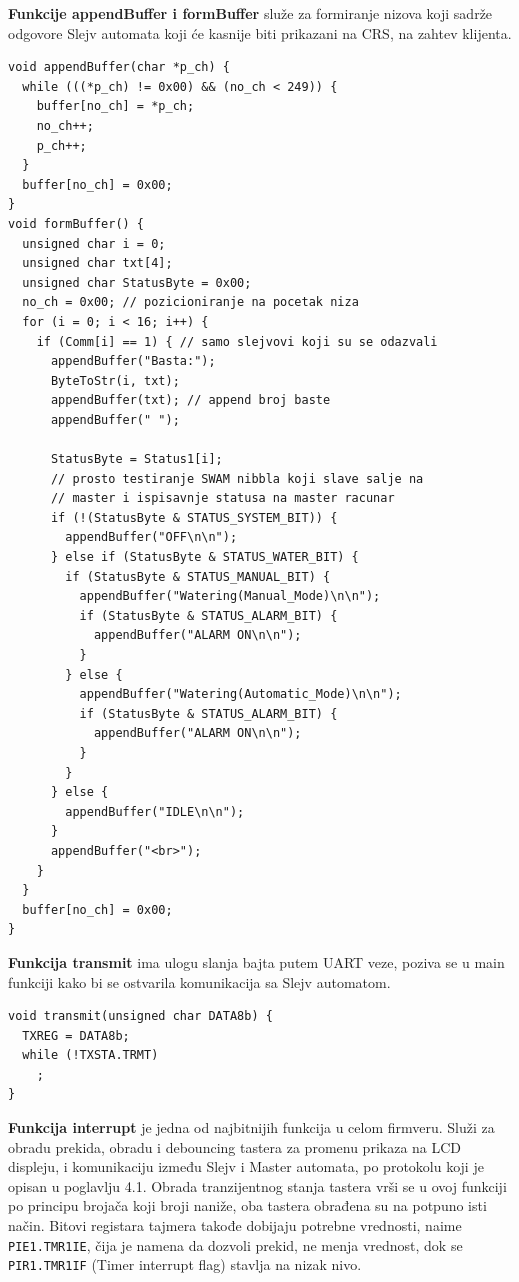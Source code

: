 \documentclass[12pt]{article}
\numberwithin{figure}{section}
\begin{document}
\textbf{Funkcije appendBuffer i formBuffer} služe za formiranje nizova koji sadrže odgovore Slejv automata koji će kasnije biti prikazani na CRS, na zahtev klijenta.
\begin{verbatim}
void appendBuffer(char *p_ch) {
  while (((*p_ch) != 0x00) && (no_ch < 249)) {
    buffer[no_ch] = *p_ch;
    no_ch++;
    p_ch++;
  }
  buffer[no_ch] = 0x00;
}
void formBuffer() {
  unsigned char i = 0;
  unsigned char txt[4];
  unsigned char StatusByte = 0x00;
  no_ch = 0x00; // pozicioniranje na pocetak niza
  for (i = 0; i < 16; i++) {
    if (Comm[i] == 1) { // samo slejvovi koji su se odazvali
      appendBuffer("Basta:");
      ByteToStr(i, txt);
      appendBuffer(txt); // append broj baste
      appendBuffer(" ");

      StatusByte = Status1[i];
      // prosto testiranje SWAM nibbla koji slave salje na
      // master i ispisavnje statusa na master racunar
      if (!(StatusByte & STATUS_SYSTEM_BIT)) {
        appendBuffer("OFF\n\n");
      } else if (StatusByte & STATUS_WATER_BIT) {
        if (StatusByte & STATUS_MANUAL_BIT) {
          appendBuffer("Watering(Manual_Mode)\n\n");
          if (StatusByte & STATUS_ALARM_BIT) {
            appendBuffer("ALARM ON\n\n");
          }
        } else {
          appendBuffer("Watering(Automatic_Mode)\n\n");
          if (StatusByte & STATUS_ALARM_BIT) {
            appendBuffer("ALARM ON\n\n");
          }
        }
      } else {
        appendBuffer("IDLE\n\n");
      }
      appendBuffer("<br>");
    }
  }
  buffer[no_ch] = 0x00;
}
\end{verbatim}
\textbf{Funkcija transmit} ima ulogu slanja bajta putem UART veze, poziva se u main funkciji kako bi se ostvarila komunikacija sa Slejv automatom.
\begin{verbatim}
void transmit(unsigned char DATA8b) {
  TXREG = DATA8b;
  while (!TXSTA.TRMT)
    ;
}
\end{verbatim}
\clearpage
\textbf{Funkcija interrupt} je jedna od najbitnijih funkcija u celom firmveru.
Služi za obradu prekida, obradu i debouncing tastera za promenu prikaza na LCD displeju, i komunikaciju između Slejv i Master automata, po protokolu koji je opisan u poglavlju 4.1.
Obrada tranzijentnog stanja tastera vrši se u ovoj funkciji po principu brojača koji broji naniže, oba tastera obrađena su na potpuno isti način.
Bitovi registara tajmera takođe dobijaju potrebne vrednosti, naime \texttt{PIE1.TMR1IE}, čija je namena da dozvoli prekid, ne menja vrednost, dok se \texttt{PIR1.TMR1IF} (Timer interrupt flag) stavlja na nizak nivo.
\end{document}
